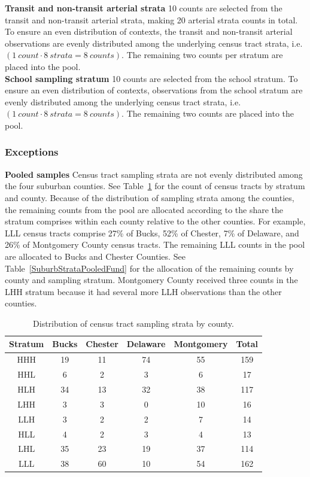 \documentclass[paper=letterpaper, fontsize=11pt]{scrartcl}
\begin{document}
\textbf{Transit and non-transit arterial strata} 10 counts are selected from the transit and non-transit arterial strata, making 20 arterial strata counts in total. To ensure an even distribution of contexts, the transit and non-transit arterial observations are evenly distributed among the underlying census tract strata, i.e. $\left(1\:count \cdot 8\: strata = 8 \: counts\right)$. The remaining two counts per stratum are placed into the pool. \\

\textbf{School sampling stratum} 10 counts are selected from the school stratum. To ensure an even distribution of contexts, observations from the school stratum are evenly distributed among the underlying census tract strata, i.e. $\left(1\:count \cdot 8\: strata = 8 \: counts\right)$. The remaining two counts are placed into the pool. \\

\subsubsection{Exceptions}

\textbf{Pooled samples} Census tract sampling strata are not evenly distributed among the four suburban counties. See Table~\ref{SuburbStrataDistribution} for the count of census tracts by stratum and county. Because of the distribution of sampling strata among the counties, the remaining counts from the pool are allocated according to the share the stratum comprises within each county relative to the other counties. For example, LLL census tracts comprise 27\% of Bucks, 52\% of Chester, 7\% of Delaware, and 26\% of Montgomery County census tracts. The remaining LLL counts in the pool are allocated to Bucks and Chester Counties. See Table~\ref{SuburbStrataPooledFund} for the allocation of the remaining counts by county and sampling stratum. Montgomery County received three counts in the LHH stratum because it had several more LLH observations than the other counties.

\begin{table}[!htbp]
	\renewcommand*{\arraystretch}{1.4}
	\centering 
	\caption{Distribution of census tract sampling strata by county.} 
	\label{SuburbStrataDistribution} 
	\begin{tabular}{|c c c c c c |} 
		\hline 
		\textbf{Stratum} & \textbf{Bucks} & \textbf{Chester} & \textbf{Delaware} & \textbf{Montgomery} & \textbf{Total} \\
		\hline
		HHH & 19 & 11 & 74 & 55 & 159 \\
		\hline
		HHL & 6 & 2 & 3 & 6 & 17 \\
		\hline
		HLH & 34 & 13 & 32 & 38 & 117 \\
		\hline
		LHH & 3 & 3 & 0 & 10 & 16 \\
		\hline
		LLH & 3 & 2 & 2 & 7 & 14 \\
		\hline
		HLL & 4 & 2 & 3 & 4 & 13\\
		\hline
		LHL & 35 & 23 & 19 & 37 & 114 \\
		\hline
		LLL & 38 & 60 & 10 & 54 & 162 \\
		\hline
	\end{tabular} 
\end{table}
\end{document}
